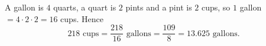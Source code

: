 A gallon is $4$ quarts, a quart is $2$ pints and a pint is $2$ cups, so $1$ gallon $=4\cdot2\cdot2=16$ cups. Hence
\[
218\text{ cups}=\dfrac{218}{16}\text{ gallons}=\dfrac{109}{8}=\boxed{13.625}\text{ gallons}.
\]
